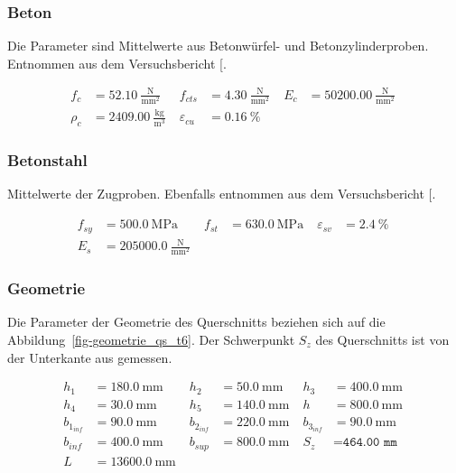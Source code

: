 \documentclass[
  11pt,
  letterpaper,
]{scrreprt}
\begin{document}
\subsubsection{Beton}\label{beton}

Die Parameter sind Mittelwerte aus Betonwürfel- und Betonzylinderproben.
Entnommen aus dem Versuchsbericht
{[}\citeproc{ref-sigrist_versuche_1993}{5}{]}.

$$
\begin{aligned}
f_{c} &= 52.10\ \frac{\mathrm{N}}{\mathrm{mm}^{2}} \; 
 &f_{cts} &= 4.30\ \frac{\mathrm{N}}{\mathrm{mm}^{2}} \; 
 &E_{c} &= 50200.00\ \frac{\mathrm{N}}{\mathrm{mm}^{2}} \; 
\\[10pt]
 \rho_{c} &= 2409.00\ \frac{\mathrm{kg}}{\mathrm{m}^{3}} \; 
 &\varepsilon_{cu} &= 0.16\ \mathrm{\%} \;
\end{aligned}
$$

\subsubsection{Betonstahl}\label{betonstahl}

Mittelwerte der Zugproben. Ebenfalls entnommen aus dem Versuchsbericht
{[}\citeproc{ref-sigrist_versuche_1993}{5}{]}.

$$
\begin{aligned}
f_{sy} &= 500.0\ \mathrm{MPa} \; 
 &f_{st} &= 630.0\ \mathrm{MPa} \; 
 &\varepsilon_{sv} &= 2.4\ \mathrm{\%} \; 
\\[10pt]
 E_{s} &= 205000.0\ \frac{\mathrm{N}}{\mathrm{mm}^{2}} \;
\end{aligned}
$$

\subsubsection{Geometrie}\label{geometrie}

Die Parameter der Geometrie des Querschnitts beziehen sich auf die
Abbildung~\ref{fig-geometrie_qs_t6}. Der Schwerpunkt \(S_z\) des
Querschnitts ist von der Unterkante aus gemessen.

$$
\begin{aligned}
h_{1} &= 180.0\ \mathrm{mm} \; 
 &h_{2} &= 50.0\ \mathrm{mm} \; 
 &h_{3} &= 400.0\ \mathrm{mm} \; 
\\[10pt]
 h_{4} &= 30.0\ \mathrm{mm} \; 
 &h_{5} &= 140.0\ \mathrm{mm} \; 
 &h &= 800.0\ \mathrm{mm} \; 
\\[10pt]
 b_{1_{inf}} &= 90.0\ \mathrm{mm} \; 
 &b_{2_{inf}} &= 220.0\ \mathrm{mm} \; 
 &b_{3_{inf}} &= 90.0\ \mathrm{mm} \; 
\\[10pt]
 b_{inf} &= 400.0\ \mathrm{mm} \; 
 &b_{sup} &= 800.0\ \mathrm{mm} \; 
 &S_{z} &= \mathtt{\text{464.00 mm}} \; 
\\[10pt]
 L &= 13600.0\ \mathrm{mm} \;
\end{aligned}
$$
\end{document}
